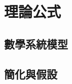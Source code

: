 \chapter{理論公式}
\renewcommand{\baselinestretch}{10.0} %
\setcounter{page}{1}  %
\fontsize{14pt}{2.5pt}\sectionef

\section{數學系統模型}




\section{簡化與假設}
